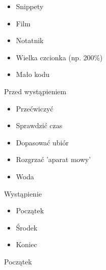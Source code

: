 \documentclass{beamer}
\begin{document}
\begin{frame}{}
	\begin{Large}
		\begin{itemize}
			\item Snippety
			\item Film
			\item Notatnik
			\item Wielka czcionka (np. 200\%)
			\item Mało kodu
		\end{itemize}
	\end{Large}
\end{frame}

\begin{frame}{}
	\begin{center}
		\Huge{Przed wystąpieniem}
	\end{center}
\end{frame}

\begin{frame}{}
	\begin{Large}
		\begin{itemize}
			\item Przećwiczyć
			\item Sprawdzić czas
			\item Dopasować ubiór
			\item Rozgrzać 'aparat mowy'
			\item Woda
		\end{itemize}
	\end{Large}
\end{frame}

\begin{frame}{}
	\begin{center}
		\Huge{Wystąpienie}
	\end{center}
\end{frame}

\begin{frame}{}
	\begin{Large}
		\begin{itemize}
			\item Początek
			\item Środek
			\item Koniec
		\end{itemize}
	\end{Large}
\end{frame}

\begin{frame}{}
	\begin{center}
		\Huge{Początek}
	\end{center}
\end{frame}
\end{document}
